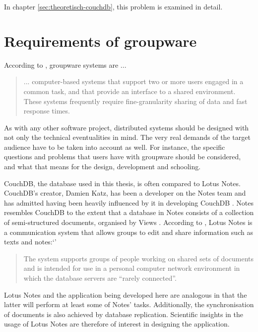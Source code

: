 In chapter \ref{sec:theoretisch-couchdb}, this problem is examined in detail.

\section{Requirements of groupware}

According to , groupware systems are ...

\begin{quote}
... computer-based systems that support two or more users engaged
in a common task, and that provide an interface to a shared environment. These systems frequently require fine-granularity sharing of data and fast response times.
\end{quote}

As with any other software project, distributed systems should be designed with not only the technical eventualities in mind. The very real demands of the target audience have to be taken into account as well. For instance, the specific questions and problems that users have with groupware should be considered, and what that means for the design, development and schooling.

CouchDB, the database used in this thesis, is often compared to Lotus Notes. CouchDB's creator, Damien Katz, has been a developer on the Notes team and has admitted having been heavily influenced by it in developing CouchDB \cite{lotusnotes:interview}. Notes resembles CouchDB to the extent that a database in Notes consists of a collection of semi-structured documents, organised by Views . According to , Lotus Notes is a communication system that allows groups to edit and share information such as texts and notes:`'

\begin{quote}
The system supports groups of people working on shared sets of documents and is intended for use in a personal computer network environment in which the database servers are \enquote{rarely connected}. 
\end{quote}

Lotus Notes and the application being developed here are analogous in that the latter will perform at least some of Notes' tasks. Additionally, the synchronisation of documents is also achieved by database replication. Scientific insights in the usage of Lotus Notes are therefore of interest in designing the application.

